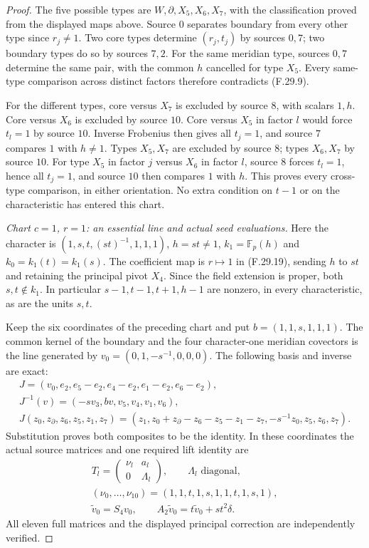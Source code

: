 \begin{proof}
The five possible types are
$W,\partial,X_5,X_6,X_7$, with the classification
proved from the displayed maps above.
Source $0$ separates boundary from every
other type since $r_j\ne1$.
Two core types determine $(r_j,t_j)$ by
sources $0,7$; two boundary types do so by
sources $7,2$. For the same meridian type,
sources $0,7$ determine the same pair, with
the common $h$ cancelled for type $X_5$.
Every same-type comparison across distinct
factors therefore contradicts (F.29.9).

For the different types, core versus $X_7$
is excluded by source $8$, with scalars $1,h$.
Core versus $X_6$ is excluded by source $10$.
Core versus $X_5$ in factor $l$ would force
$t_l=1$ by source $10$. Inverse Frobenius then
gives all $t_j=1$, and source $7$ compares
$1$ with $h\ne1$.
Types $X_5,X_7$ are excluded by source $8$;
types $X_6,X_7$ by source $10$.
For type $X_5$ in factor $j$ versus $X_6$
in factor $l$, source $8$ forces $t_l=1$,
hence all $t_j=1$, and source $10$ then
compares $1$ with $h$.
This proves every cross-type comparison,
in either orientation. No extra condition
on $t-1$ or on the characteristic has entered
this chart.

\emph{Chart $c=1$, $r=1$: an essential line and actual seed evaluations.}
Here the character is
$(1,s,t,(st)^{-1},1,1,1)$, $h=st\ne1$,
$k_1=\mathbb F_p(h)$ and $k_0=k_1(t)=k_1(s)$.
The coefficient map is $r\mapsto1$ in
(F.29.19), sending $h$ to $st$ and retaining
the principal pivot $X_4$.
Since the field extension is proper, both
$s,t\notin k_1$. In particular
$s-1,t-1,t+1,h-1$ are nonzero, in every
characteristic, as are the units $s,t$.

Keep the six coordinates of the preceding
chart and put $b=(1,1,s,1,1,1)$.
The common kernel of the boundary and the
four character-one meridian covectors is
the line generated by $v_0=(0,1,-s^{-1},0,0,0)$.
The following basis and inverse are exact:
\[
 \begin{gathered}
 J=(v_0,e_2,e_5-e_2,e_4-e_2,e_1-e_2,e_6-e_2),\\
 J^{-1}(v)=(-sv_3,bv,v_5,v_4,v_1,v_6),\\
 J(z_0,z_\partial,z_6,z_5,z_1,z_7)
  =(z_1,z_0+z_\partial-z_6-z_5-z_1-z_7,
                                  -s^{-1}z_0,z_5,z_6,z_7).
 \end{gathered}                                                \tag{F.29.23}
\]
Substitution proves both composites to be the
identity. In these coordinates the actual
source matrices and one required lift identity are
\[
 \begin{gathered}
 T_l=\begin{pmatrix}\nu_l&a_l\\0&\Lambda_l\end{pmatrix},
 \qquad \Lambda_l\text{ diagonal},\\
 (\nu_0,\ldots,\nu_{10})=(1,1,t,1,s,1,1,t,1,s,1),\\
 \widetilde v_0=S_4v_0,\qquad
 A_2\widetilde v_0=t\widetilde v_0+st^2\delta.
 \end{gathered}                                                \tag{F.29.24}
\]
All eleven full matrices and the displayed
principal correction are independently verified.


\end{proof}
